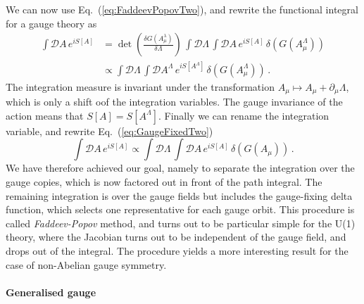 \documentclass[notes]{subfiles}
\begin{document}
We can now use Eq.~(\ref{eq:FaddeevPopovTwo}), and rewrite the
functional integral for a gauge theory as
\begin{align}
  \int \mathcal{D}A\, e^{i S[A]} 
  &= \det \left(
    \frac{\delta G\left(A^\lambda_\mu\right)}{\delta \Lambda}
    \right)\, \int \mathcal{D}\Lambda\, 
    \int \mathcal{D}A\,  e^{i S[A]} \, \delta\left(G\left(
      A^\Lambda_\mu\right)\right) \\
  \label{eq:GaugeFixedTwo}
  &\propto \int \mathcal{D}\Lambda\, 
    \int \mathcal{D}A^\Lambda\,  e^{i S[A^\Lambda]} \, \delta\left(G\left(
      A^\Lambda_\mu\right)\right) \, .
\end{align}
The integration measure is invariant under the transformation $A_\mu
\mapsto A_\mu + \partial_\mu \Lambda$, which is only a shift oof the
integration variables. The gauge invariance of the action means that
$S[A] = S[A^\Lambda]$. Finally we can rename the integration variable,
and rewrite Eq.~(\ref{eq:GaugeFixedTwo})
\begin{equation}
  \label{eq:GaugeFixedThree}
  \int \mathcal{D}A\, e^{i S[A]} 
  \propto \int \mathcal{D}\Lambda\, 
    \int \mathcal{D}A\,  e^{i S[A]} \, \delta\left(G\left(
      A_\mu\right)\right) \, .
\end{equation}
We have therefore achieved our goal, namely to separate the
integration over the gauge copies, which is now factored out in front
of the path integral. The remaining integration is over the gauge
fields but includes the gauge-fixing delta function, which selects one
representative for each gauge orbit. This procedure is called {\em
  Faddeev-Popov} method, and turns out to be particular simple for the
U(1) theory, where the Jacobian turns out to be independent of the
gauge field, and drops out of the integral. The procedure yields a
more interesting result for the case of non-Abelian gauge symmetry.  

\paragraph{Generalised gauge }
\end{document}
